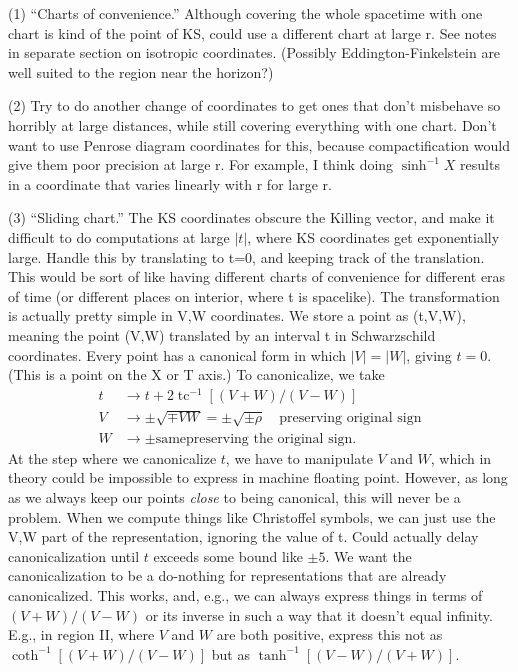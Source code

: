 \documentclass{article}
\begin{document}
(1) ``Charts of convenience.'' Although covering the whole spacetime with one chart is kind of the point of KS,
could use a different chart at large r. See notes in separate section on isotropic coordinates.
(Possibly
Eddington-Finkelstein are well suited to the region near the horizon?)

(2) Try to do another change of coordinates to get ones that don't misbehave so horribly at
large distances, while still covering everything with one chart. Don't want to use Penrose diagram
coordinates for this, because compactification would give them poor precision at large r. For example,
I think doing $\sinh^{-1}X$ results in a coordinate that varies linearly with r for large r. 

(3) ``Sliding chart.'' The KS coordinates obscure the Killing vector, and make it difficult
to do computations at large $|t|$, where KS coordinates get exponentially large.
Handle this by translating to t=0, and keeping track of the translation. This would be sort of like
having different charts of convenience for different eras of time (or different places on interior,
where t is spacelike). The transformation is actually pretty
simple in V,W coordinates. We store a point 
as (t,V,W), meaning the point (V,W) translated by an interval t in Schwarzschild coordinates.
Every point has a canonical form in which $|V|=|W|$, giving $t=0$. (This is a point on the X
or T axis.) To canonicalize, we take
\begin{align*}
  t &\rightarrow t+2\operatorname{tc}^{-1}[(V+W)/(V-W)] \\
  V &\rightarrow \pm\sqrt{\mp VW} = \pm\sqrt{\pm\rho} \quad \text{preserving original sign} \\
  W &\rightarrow \pm \text{same} \text{preserving the original sign}.
\end{align*}
At the step where we  canonicalize $t$, we have to manipulate $V$ and $W$, which in theory could
be impossible to express in machine floating point. However, as long as we always keep our points
\emph{close} to being canonical, this will never be a problem. When we compute things like Christoffel
symbols, we can just use the V,W part of the representation, ignoring the value of t. Could actually
delay canonicalization until $t$ exceeds some bound like $\pm5$. We want the canonicalization to be
a do-nothing for representations that are already canonicalized. This works, and, e.g., we can
always express things in terms of $(V+W)/(V-W)$ or its inverse in such a way that it doesn't equal
infinity. E.g., in region II, where $V$ and $W$ are both positive,
express this not as $\coth^{-1}[(V+W)/(V-W)]$ but as
$\tanh^{-1}[(V-W)/(V+W)]$.
\end{document}
